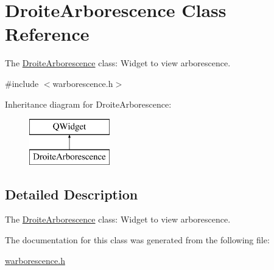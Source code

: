 \hypertarget{class_droite_arborescence}{}\section{Droite\+Arborescence Class Reference}
\label{class_droite_arborescence}


The \hyperlink{class_droite_arborescence}{Droite\+Arborescence} class\+: Widget to view arborescence.  




{\ttfamily \#include $<$warborescence.\+h$>$}

Inheritance diagram for Droite\+Arborescence\+:\begin{figure}[H]
\begin{center}
\leavevmode
\includegraphics[height=2.000000cm]{class_droite_arborescence}
\end{center}
\end{figure}


\subsection{Detailed Description}
The \hyperlink{class_droite_arborescence}{Droite\+Arborescence} class\+: Widget to view arborescence. 

The documentation for this class was generated from the following file\+:\begin{DoxyCompactItemize}
\item 
\hyperlink{warborescence_8h}{warborescence.\+h}\end{DoxyCompactItemize}
